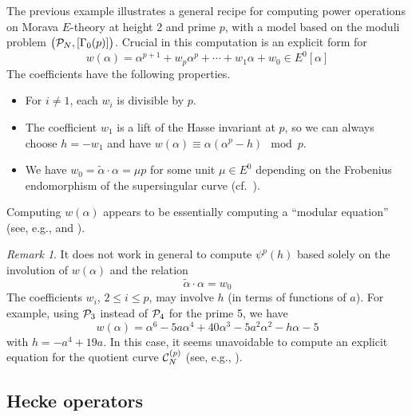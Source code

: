 \documentclass{gtpart}
\theoremstyle{definition}
\theoremstyle{remark}
\newtheorem{rmk}[thm]{Remark}
\newcommand{\CC}{{\cal C}}
\newcommand{\CP}{{\cal P}}
\newcommand{\A}{\alpha}
\newcommand{\G}{\Gamma}
\renewcommand{\=}{\approx}
\renewcommand{\-}{\sim}
\numberwithin{equation}{section}
\numberwithin{thm}{section}
\begin{document}
The previous example illustrates a general recipe for computing power operations on Morava $E$-theory at height 2 and prime $p$, 
with a model based on the moduli problem $\big(\CP_N,[\G_0(p)]\big)$.  
Crucial in this computation is an explicit form for 
\begin{equation}
 \label{generalw}
 w(\A) = \A^{p + 1} + w_p \A^p + \cdots + w_1 \A + w_0 \in E^0[\A] 
\end{equation}
The coefficients have the following properties.  
\begin{itemize}
 \item For $i \neq 1$, each $w_i$ is divisible by $p$.  

 \item The coefficient $w_1$ is a lift of the Hasse invariant at $p$, 
 so we can always choose $h = -w_1$ and have $w(\A) \equiv \A (\A^p - h) \mod p$.  

 \item We have $w_0 = \widetilde{\A} \cdot \A = \mu p$ for some unit $\mu \in E^0$ depending on the Frobenius endomorphism of the supersingular curve 
 (cf.~\cite[3.8]{mc1}).  
\end{itemize}
Computing $w(\A)$ appears to be essentially computing a ``modular equation'' (see, e.g., \cite[II.6]{Milne} and \cite{MO}).  

\begin{rmk}
 \label{rmk:invl}
 It does not work in general to compute $\psi^p(h)$ based solely on the involution of $w(\A)$ and the relation 
 \begin{equation}
  \label{w0}
  \widetilde{\A} \cdot \A = w_0 
 \end{equation}
 The coefficients $w_i$, $2 \leq i \leq p$, may involve $h$ (in terms of functions of $a$).  
 For example, using $\CP_3$ instead of $\CP_4$ for the prime 5, we have 
 \[
  w(\A) = \A^6 - 5 a \A^4 + 40 \A^3 - 5 a^2 \A^2 - h \A - 5 
 \]
 with $h = -a^4 + 19 a$.  
 In this case, it seems unavoidable to compute an explicit equation for the quotient curve $\CC_N^{(p)}$ 
 (see, e.g., \cite[proof of Proposition 2.3]{p3}).  
\end{rmk}



\subsection{Hecke operators}
\label{subsec:ho}
\end{document}
